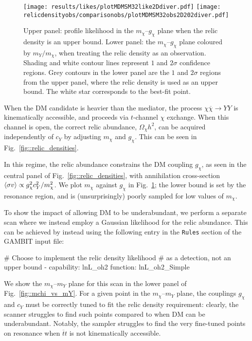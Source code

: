 \documentclass[pdftex,twocolumn,epjc3_preprint,runningheads]{svjour3}
\renewcommand{\_}{\discretionary{\underscore}{}{\underscore}}
\newcommand\yaml[1]{{\lstset{style=yaml}\lstinline!#1!\lstset{style=cpp}}}
\newcommand{\gambit}{\textsf{GAMBIT}\xspace}
\newcommand{\GB}{\gambit}
\begin{document}
\begin{figure}
  \centering
  \texttt{[image: results/likes/plot\_MDMSM\_3\_2\_like2D\_diver.pdf]}
  \texttt{[image: relicdensity\_obs/comparison\_obs/plot\_MDMSM\_3\_2\_obs2D\_202\_diver.pdf]}
  \caption{Upper panel: profile likelihood in the $m_\chi$--$g_\chi$ plane when the relic density is an upper bound. Lower panel: the $m_\chi$--$g_\chi$ plane coloured by $m_Y/m_\chi$, when treating the relic density as an observation. Shading and white contour lines represent $1$ and $2\sigma$ confidence regions. Grey contours in the lower panel are the $1$ and $2\sigma$ regions from the upper panel, where the relic density is used as an upper bound. The white star corresponds to the best-fit point.}
  \vspace{-2mm}
  \label{fig::mchi_vs_gchi}
\end{figure}

When the DM candidate is heavier than the mediator, the process $\chi\overline{\chi} \rightarrow Y Y$ is kinematically accessible, and proceeds via $t$-channel $\chi$ exchange. When this channel is open, the correct relic abundance, $\Omega_\chi h^2$, can be acquired independently of $c_Y$ by adjusting $m_\chi$ and $g_\chi$. This can be seen in Fig.~\ref{fig::relic_densities}.

In this regime, the relic abundance constrains the DM coupling $g_\chi$, as seen in the central panel of Fig.~\ref{fig::relic_densities}, with annihilation cross-section $\braket{\sigma v} \propto g_\chi^2 c_Y^2 / m_\chi^2$.  We plot $m_\chi$ against $g_\chi$ in Fig.~\ref{fig::mchi_vs_gchi}; the lower bound is set by the resonance region, and is (unsurprisingly) poorly sampled for low values of $m_\chi$.

To show the impact of allowing DM to be underabundant, we perform a separate scan where we instead employ a Gaussian likelihood for the relic abundance. This can be achieved by instead using the following entry in the \yaml{Rules} section of the \GB input file:

\begin{lstyaml}
  # Choose to implement the relic density likelihood
  # as a detection, not an upper bound
  - capability: lnL_oh2
    function: lnL_oh2_Simple
\end{lstyaml}

We show the $m_\chi$--$m_Y$ plane for this scan in the lower panel of Fig.~\ref{fig::mchi_vs_mY}. For a given point in the $m_\chi$--$m_Y$ plane, the couplings $g_\chi$ and $c_Y$ must be correctly tuned to fit the relic density requirement: clearly, the scanner struggles to find such points compared to when DM can be underabundant. Notably, the sampler struggles to find the very fine-tuned points on resonance when $\overline{t}t$ is not kinematically accessible.
\end{document}
